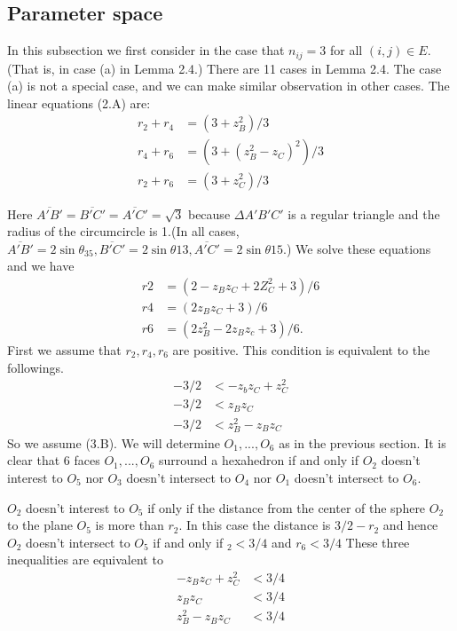\documentclass[dvipdfmx]{interact}
\theoremstyle{plain}%
\theoremstyle{definition}
\theoremstyle{remark}
\theoremstyle{problemstyle}
\begin{document}
\subsection{Parameter space}
In this subsection we first consider in the case that $n_{ij} = 3$ for all
$(i, j) \in E$. (That is, in case (a) in Lemma 2.4.) There are 11 cases
in Lemma 2.4. The case (a) is not a special case, and we can make
similar observation in other cases.
The linear equations (2.A) are:
\begin{align*}
 r_2 + r_4 &= (3 + z_B^2) / 3 \\
 r_4 + r_6 &= (3 + (z_B^2 - z_C)^2 ) / 3 \\
 r_2 + r_6 &= (3 + z_C^2) / 3
\end{align*}

Here $\overline{A'B'} = \overline{B'C'} = \overline{A'C'} = \sqrt{3}$
because $\Delta{A'B'C'}$ is a regular triangle and the radius of the
circumcircle is 1.(In all cases, $\overline{A'B'} = 2\sin\theta_{35},
\overline{B'C'} = 2\sin\theta{13}, \overline{A'C'} = 2\sin\theta{15}$.)
We solve these equations and we have 
\begin{align}
 r2 &= (2-z_Bz_C + 2Z^2_C + 3) / 6 \\
 r4 &= (2z_Bz_C + 3) / 6 \\
 r6 &= (2z^2_B - 2z_Bz_c + 3) / 6.
\end{align}
First we assume that $r_2, r_4, r_6$ are positive. This condition is
equivalent to the followings.
\begin{align}
 -3 / 2 &< -z_bz_C + z^2_C\\
 -3 / 2 &< z_Bz_C \\
 -3 / 2 &< z^2_B - z_Bz_C
\end{align}
So we assume (3.B). We will determine $O_1, ... , O_6$ as in the
previous section. It is clear that 6 faces $O_1, ... , O_6$ surround
a hexahedron if and only if $O_2$ doesn't interest to $O_5$ nor $O_3$
doesn't intersect to $O_4$ nor $O_1$ doesn't intersect to $O_6$.

$O_2$ doesn't interest to $O_5$ if only if the distance from the center
of the sphere $O_2$ to the plane $O_5$ is more than $r_2$. In this case
the distance is $3 / 2 - r_2$ and hence $O_2$ doesn't intersect to $O_5$
if and only if $_2 < 3/4$ and $r_6 < 3 / 4$ These three inequalities are
equivalent to
\begin{align}
 -z_Bz_C + z^2_C &< 3 / 4\\
 z_Bz_C &< 3 / 4 \\
 z^2_B - z_B z_C &< 3/ 4
\end{align}
\end{document}
